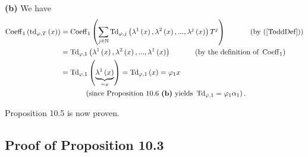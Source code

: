 \documentclass[numbers=enddot,12pt,final,onecolumn,notitlepage]{scrartcl}%
\begin{document}
\textbf{(b)} We have%
\begin{align*}
\operatorname*{Coeff}\nolimits_{1}\left(  \operatorname*{td}\nolimits_{\varphi
,T}\left(  x\right)  \right)   &  =\operatorname*{Coeff}\nolimits_{1}\left(
\sum_{j\in\mathbb{N}}\operatorname*{Td}\nolimits_{\varphi,j}\left(
\lambda^{1}\left(  x\right)  ,\lambda^{2}\left(  x\right)  ,...,\lambda
^{j}\left(  x\right)  \right)  T^{j}\right)  \ \ \ \ \ \ \ \ \ \ \left(
\text{by (\ref{ToddDef})}\right) \\
&  =\operatorname*{Td}\nolimits_{\varphi,1}\left(  \lambda^{1}\left(
x\right)  ,\lambda^{2}\left(  x\right)  ,...,\lambda^{1}\left(  x\right)
\right)  \ \ \ \ \ \ \ \ \ \ \left(  \text{by the definition of }%
\operatorname*{Coeff}\nolimits_{1}\right) \\
&  =\operatorname*{Td}\nolimits_{\varphi,1}\left(  \underbrace{\lambda
^{1}\left(  x\right)  }_{=x}\right)  =\operatorname*{Td}\nolimits_{\varphi
,1}\left(  x\right)  =\varphi_{1}x\\
&  \ \ \ \ \ \ \ \ \ \ \left(  \text{since Proposition 10.6 \textbf{(b)}
yields }\operatorname*{Td}\nolimits_{\varphi,1}=\varphi_{1}\alpha_{1}\right)
.
\end{align*}


Proposition 10.5 is now proven.

\subsection{Proof of Proposition 10.3}
\end{document}
